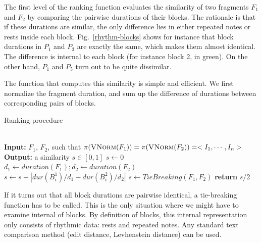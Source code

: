 \documentclass[letterpaper, 11pt]{article}
\newcommand{\remPR}[1]{%
\vspace*{0.1cm}
\hrule
\medskip
\noindent
\textbf{\textcolor{maroon}{Philippe}}: \textit{#1}
\medskip
\hrule
\vspace*{0.1cm}
}
\newcommand{\remNT}[1]{%
\vspace*{0.1cm}
\hrule
\medskip
\noindent
\textbf{\textcolor{mygreen}{Nicolas}}: \textit{#1}
\medskip
\hrule
\vspace*{0.1cm}
}
\begin{document}
The first level of the ranking function evaluates the similarity of two fragments $F_1$ and $F_2$
by comparing the pairwise durations
of their blocks. The rationale is that if these durations are similar, the only difference lies
in either repeated notes or rests inside each block.  Fig.~\ref{rhythm-blocks} shows for instance
that block durations in $P_1$ and $P_3$ are exactly the same, which makes them almost identical.
The difference is internal to each block (for instance block 2, in green). On the other hand,
$P_1$ and $P_5$ turn out to be quite dissimilar. 

The function that computes  this similarity is simple and efficient. We first normalize the fragment duration,
and sum up the difference of durations between corresponding pairs of blocks.

\begin{algorithm}
\caption{Ranking procedure}\label{alg:ranking}
\begin{algorithmic}[1]
\\
\textbf{Input:} $F_1$, $F_2$, such that $\pi(\textsc{VNorm}(F_1)) = \pi(\textsc{VNorm}(F_2))  = <I_1, \cdots, I_n>$\\
\textbf{Output:} a similarity $s \in [0,1]$
\State $s\gets 0$
\State $d_1 \gets duration(F_1); d_2 \gets duration(F_2)$
\State $s \gets s + | dur (B^1_i)/d_1 - dur (B^2_i)/d_2 |$
\EndFor
{}
 $s \gets TieBreaking (F_1, F_2)$
\EndIf
\State \textbf{return} $s/2$
\EndProcedure
\end{algorithmic}
\end{algorithm}



If it turns out that all block durations are pairwise identical, 
a tie-breaking function has to be called. This is the only situation where we might have to examine internal of blocks. By definition of blocks, this internal representation only consists
of rhythmic data: rests and repeated notes. Any standard  text comparison method (edit distance,
Levhenstein distance) can be used.
\end{document}
